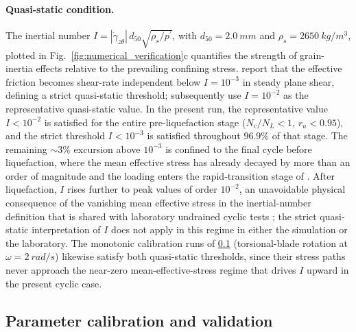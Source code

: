 \documentclass[a4paper,fleqn]{cas-sc}
\newcommand{\ru}{\ensuremath{r_u}}
\newcommand{\pmean}{\ensuremath{p^\prime}}
\begin{document}
\paragraph{Quasi-static condition.}
The inertial number $I=|\dot\gamma_{z\theta}|\,d_{50}\sqrt{\rho_s/\pmean}$, with $d_{50}=\SI{2.0}{mm}$ and $\rho_s=\SI{2650}{kg/m^3}$, plotted in Fig.~\ref{fig:numerical_verification}c quantifies the strength of grain-inertia effects relative to the prevailing confining stress. \citet{GDRMiDi2004} report that the effective friction becomes shear-rate independent below $I = 10^{-3}$ in steady plane shear, defining a strict quasi-static threshold; \citet{daCruzEmam2005} subsequently use $I = 10^{-2}$ as the representative quasi-static value. In the present run, the representative value $I < 10^{-2}$ is satisfied for the entire pre-liquefaction stage ($N_c/N_L < 1$, $\ru < 0.95$), and the strict threshold $I < 10^{-3}$ is satisfied throughout $96.9\%$ of that stage. The remaining $\sim 3\%$ excursion above $10^{-3}$ is confined to the final cycle before liquefaction, where the mean effective stress has already decayed by more than an order of magnitude and the loading enters the rapid-transition stage of \citet{Wang2025inertial}. After liquefaction, $I$ rises further to peak values of order $10^{-2}$, an unavoidable physical consequence of the vanishing mean effective stress in the inertial-number definition that is shared with laboratory undrained cyclic tests \citep{Wang2025inertial}; the strict quasi-static interpretation of $I$ does not apply in this regime in either the simulation or the laboratory. The monotonic calibration runs of \cref{subsec:calibration_validation} (torsional-blade rotation at $\omega = \SI{2}{rad/s}$) likewise satisfy both quasi-static thresholds, since their stress paths never approach the near-zero mean-effective-stress regime that drives $I$ upward in the present cyclic case.

\FloatBarrier

\subsection{Parameter calibration and validation}
\label{subsec:calibration_validation}
\end{document}
